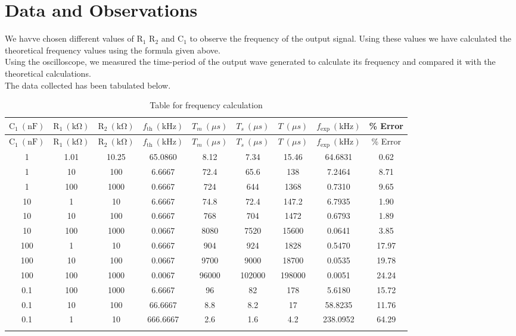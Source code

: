 \documentclass[12pt]{article}
\begin{document}
\section{Data and Observations}
We havve chosen different values of $\mathrm{R_1}$ $\mathrm{R_2}$ and $\mathrm{C_1}$ to observe the frequency of the output signal. Using these values we have calculated the theoretical frequency values using the formula given above.\\
Using the oscilloscope, we measured the time-period of the output wave generated to calculate its frequency and compared it with the theoretical calculations. \\
The data collected has been tabulated below.
\begin{longtable}{|c|c|c|c||c|c|c|c||c|}
    \hline
    $\mathrm{C_1\ (nF)}$ & $\mathrm{R_1\ (k\Omega)}$ & $\mathrm{R_2\ (k\Omega)}$ & $f_\mathrm{th}\ (\mathrm{kHz})$ & $T_m\ (\mu s)$ & $T_s\ (\mu s)$ & $T\ (\mu s)$ & $f_\mathrm{exp}\ (\mathrm{kHz})$ & \% Error \\
    \hline
    \endfirsthead
    
    \hline
    $\mathrm{C_1\ (nF)}$ & $\mathrm{R_1\ (k\Omega)}$ & $\mathrm{R_2\ (k\Omega)}$ & $f_\mathrm{th}\ (\mathrm{kHz})$ & $T_m\ (\mu s)$ & $T_s\ (\mu s)$ & $T\ (\mu s)$ & $f_\mathrm{exp}\ (\mathrm{kHz})$ & \% Error \\
    \hline
    \endhead
    
    \hline
    \endfoot
    
    \endlastfoot
    
    1 & 1.01 & 10.25 & 65.0860 & 8.12 & 7.34 & 15.46 & 64.6831 & 0.62 \\ \hline
    1 & 10 & 100 & 6.6667 & 72.4 & 65.6 & 138 & 7.2464 & 8.71 \\ \hline
    1 & 100 & 1000 & 0.6667 & 724 & 644 & 1368 & 0.7310 & 9.65 \\ \hline
    10 & 1 & 10 & 6.6667 & 74.8 & 72.4 & 147.2 & 6.7935 & 1.90 \\ \hline
    10 & 10 & 100 & 0.6667 & 768 & 704 & 1472 & 0.6793 & 1.89 \\ \hline
    10 & 100 & 1000 & 0.0667 & 8080 & 7520 & 15600 & 0.0641 & 3.85 \\ \hline
    100 & 1 & 10 & 0.6667 & 904 & 924 & 1828 & 0.5470 & 17.97 \\ \hline
    100 & 10 & 100 & 0.0667 & 9700 & 9000 & 18700 & 0.0535 & 19.78 \\ \hline
    100 & 100 & 1000 & 0.0067 & 96000 & 102000 & 198000 & 0.0051 & 24.24 \\ \hline
    0.1 & 100 & 1000 & 6.6667 & 96 & 82 & 178 & 5.6180 & 15.72 \\ \hline
    0.1 & 10 & 100 & 66.6667 & 8.8 & 8.2 & 17 & 58.8235 & 11.76 \\ \hline
    0.1 & 1 & 10 & 666.6667 & 2.6 & 1.6 & 4.2 & 238.0952 & 64.29 \\ \hline
    
    \caption{Table for frequency calculation}
\end{longtable}
\end{document}
